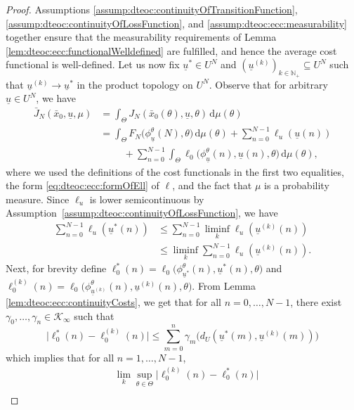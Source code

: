 \documentclass[letterpaper, 10 pt, conference]{IEEEconf}  %
\newcommand{\Np}{\mathbb{N}_+} %
\newcommand{\diff}{\, \mathrm{d}} %
\newcommand{\cKi}{\mathcal{K}_\infty} %
\newcommand{\s}{\phi} %
\newcommand{\es}{\bar{x}} %
\newcommand{\is}[1]{{\underline{#1}}} %
\theoremstyle{theorem}
\theoremstyle{definition}
\theoremstyle{remark}
\begin{document}
\begin{proof}
Assumptions  \ref{assump:dteoc:continuityOfTransitionFunction}, \ref{assump:dteoc:continuityOfLossFunction}, and \ref{assump:dteoc:ecc:measurability} together ensure that the measurability requirements of Lemma \ref{lem:dteoc:ecc:functionalWelldefined} are fulfilled, and hence the average cost functional is well-defined.
Let us now fix $\is{u}^\ast \in U^N$ and $(\is{u}^{(k)})_{k\in\Np} \subseteq U^N$ such that $\is{u}^{(k)}\rightarrow \is{u}^\ast$ in the product topology on $U^N$.
Observe that for arbitrary $\is{u}\in U^N$, we have
\begin{align*}
    \bar J_N(\es_0,\is{u},\mu) & = \int_{\Theta} J_N(\es_0(\theta),\is{u},\theta) \diff \mu(\theta) \\
    & = \int_\Theta F_N\big( \s_{\is{u}}^\theta(N), \theta \big) \diff \mu(\theta) 
        + \sum_{n=0}^{N-1} \ell_u(\is{u}(n)) \\
        & \hspace{1cm} + \sum_{n=0}^{N-1} \int_\Theta \ell_0 \big( \s_{\is{u}}^\theta(n), \is{u}(n), \theta \big) \diff \mu(\theta),
\end{align*}
where we used the definitions of the cost functionals in the first two equalities,
the form \eqref{eq:dteoc:ecc:formOfEll} of $\ell$, and the fact that $\mu$ is a probability measure.
Since $\ell_u$ is lower semicontinuous by Assumption~\ref{assump:dteoc:continuityOfLossFunction}, we have 
\begin{align*}
    \sum_{n=0}^{N-1} \ell_u(\is{u}^\ast(n)) & \leq \sum_{n=0}^{N-1} \liminf_{k} \ell_u(\is{u}^{(k)}(n)) \\
        & \leq \liminf_{k} \sum_{n=0}^{N-1} \ell_u(\is{u}^{(k)}(n)).
\end{align*}
Next, for brevity define $\ell_0^\ast(n) =  \ell_0 \big( \s_{\is{u}^\ast}^\theta(n), \is{u}^\ast(n), \theta \big)$ and $\ell_0^{(k)}(n) =  \ell_0 \big( \s_{\is{u}^{(k)}}^\theta(n), \is{u}^{(k)}(n), \theta \big) $.
From Lemma \ref{lem:dteoc:ecc:continuityCosts}, we get that for all $n=0,\ldots,N-1$, there exist $\gamma_0,\ldots,\gamma_{n}\in\cKi$ such that
\begin{equation*}
    \big| \ell_0^\ast(n) - \ell_0^{(k)}(n) \big| \leq \sum_{m=0}^{n} \gamma_m \big(d_U(\is{u}^\ast(m),\is{u}^{(k)}(m)) \big)
\end{equation*}
which implies that for all $n=1,\ldots,N-1$,
\begin{align*}
    & \lim_{k} \sup_{\theta\in\Theta} 
        \Big| \ell_0^{(k)}(n)  - \ell_0^\ast(n) \Big|
     \\

\end{align*}
\end{proof}
\end{document}
